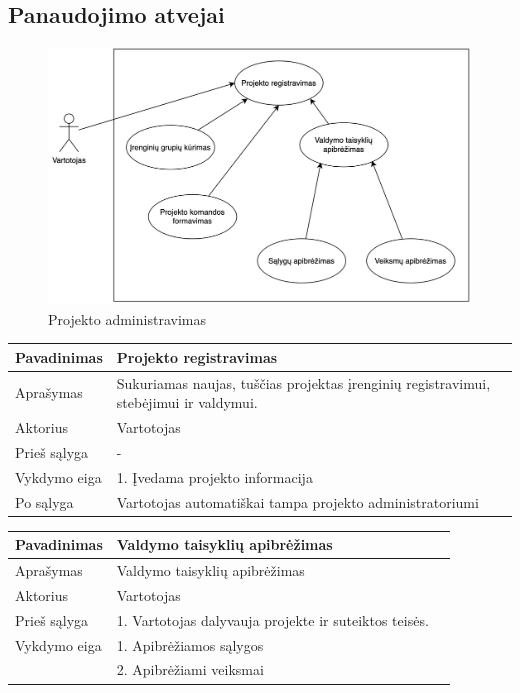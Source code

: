 \documentclass{VUMIFInfBakalaurinis}
\begin{document}
\subsection{Panaudojimo atvejai}

\begin{figure}[H]
  \centering
  \includegraphics[scale=0.6]{img/UC-projects}
  \caption{Projekto administravimas}
  \label{img:mlp}
\end{figure}

%
%
\begin{tabular}{  l  p{10cm}  p{15cm} }
\toprule
\textbf{Pavadinimas}
& \textbf{Projekto registravimas} \\
\midrule

Aprašymas
& Sukuriamas naujas, tuščias projektas įrenginių registravimui, stebėjimui ir valdymui. \\

\hline
Aktorius    
& Vartotojas \\

\hline
Prieš sąlyga
& - \\

\hline
Vykdymo eiga    
& 1. Įvedama projekto informacija \\

\hline
Po sąlyga
& Vartotojas automatiškai tampa projekto administratoriumi \\
\bottomrule
\end{tabular}

\hfill \break

%
%
\begin{tabular}{  l  p{10cm}  p{15cm} }

\toprule
\textbf{Pavadinimas}
& \textbf{Valdymo taisyklių apibrėžimas} \\
\midrule

Aprašymas
& Valdymo taisyklių apibrėžimas \\

\hline
Aktorius    
& Vartotojas \\

\hline
Prieš sąlyga
& 1. Vartotojas dalyvauja projekte ir suteiktos teisės. \\

\hline
Vykdymo eiga    
& 1. Apibrėžiamos sąlygos \\
& 2. Apibrėžiami veiksmai \\
\bottomrule
\end{tabular}
\end{document}
